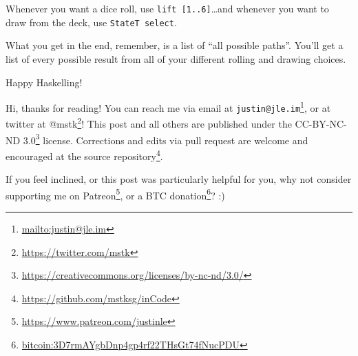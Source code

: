 \documentclass[]{article}
\renewcommand{\href}[2]{#2\footnote{\url{#1}}}
\begin{document}
Whenever you want a dice roll, use \texttt{lift\ {[}1..6{]}}\ldots{}and whenever
you want to draw from the deck, use \texttt{StateT\ select}.

What you get in the end, remember, is a list of ``all possible paths''. You'll
get a list of every possible result from all of your different rolling and
drawing choices.

Happy Haskelling!

Hi, thanks for reading! You can reach me via email at
\href{mailto:justin@jle.im}{\nolinkurl{justin@jle.im}}, or at twitter at
\href{https://twitter.com/mstk}{@mstk}! This post and all others are published
under the \href{https://creativecommons.org/licenses/by-nc-nd/3.0/}{CC-BY-NC-ND
3.0} license. Corrections and edits via pull request are welcome and encouraged
at \href{https://github.com/mstksg/inCode}{the source repository}.

If you feel inclined, or this post was particularly helpful for you, why not
consider \href{https://www.patreon.com/justinle}{supporting me on Patreon}, or a
\href{bitcoin:3D7rmAYgbDnp4gp4rf22THsGt74fNucPDU}{BTC donation}? :)
\end{document}
